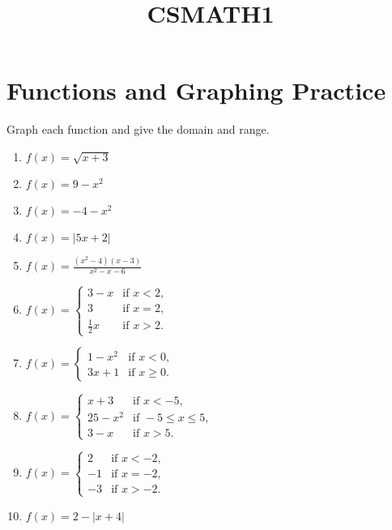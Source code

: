 \documentclass{book}
\title{CSMATH1}
\begin{document}
\maketitle
\vspace{0.2cm}

\section{Functions and Graphing Practice}
Graph each function and give the domain and range.

\vspace{0.2cm}

\begin{enumerate}
    \item $f(x) = \sqrt{x + 3}$
    \item $f(x) = 9 - x^2$
    \item $f(x) = -4 - x^2$
    \item $f(x) = |5x + 2|$
    \item $f(x) = \frac{(x^2 - 4)(x - 3)}{x^2 - x - 6}$
    \item $f(x) = \begin{cases} 
        3 - x & \text{if } x < 2, \\
        3 & \text{if } x = 2, \\
        \frac{1}{2}x & \text{if } x > 2.
    \end{cases}$
    \item $f(x) = \begin{cases} 
        1 - x^2 & \text{if } x < 0, \\
        3x + 1 & \text{if } x \geq 0.
    \end{cases}$
    \item $f(x) = \begin{cases} 
        x + 3 & \text{if } x < -5, \\
        25 - x^2 & \text{if } -5 \leq x \leq 5, \\
        3 - x & \text{if } x > 5.
    \end{cases}$
    \item $f(x) = \begin{cases} 
        2 & \text{if } x < -2, \\
        -1 & \text{if } x = -2, \\
        -3 & \text{if } x > -2.
    \end{cases}$
    \item $f(x) = 2 - |x + 4|$
\end{enumerate}
\end{document}
